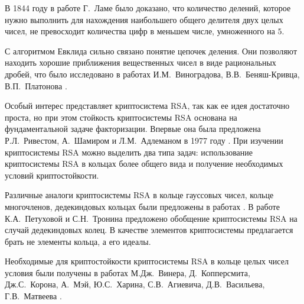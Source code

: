 \documentclass[_00_dissertation.tex]{subfiles}
\begin{document}
В 1844 году в работе Г.~Ламе было доказано, что количество делений, которое нужно выполнить для нахождения наибольшего общего делителя двух целых чисел, не превосходит количества цифр в меньшем числе, умноженного на $5$.

С алгоритмом Евклида сильно связано понятие цепочек деления.
Они позволяют находить хорошие приближения вещественных чисел в виде рациональных дробей, что было исследовано в работах И.М.~Виноградова,  В.В.~Беняш-Кривца, В.П.~Платонова \cite{source:Benyash-Krivets_1, source:Benyash-Krivets_2, source:Vinogradov}.

Особый интерес представляет криптосистема RSA, так как ее идея достаточно проста, но при этом стойкость криптосистемы RSA основана на фундаментальной задаче факторизации.
Впервые она была предложена Р.Л.~Ривестом, А.~Шамиром и Л.М.~Адлеманом в 1977 году \cite{source:Rivest}.
При изучении криптосистемы RSA можно выделить два типа задач: использование криптосистемы RSA в кольцах более общего вида и получение необходимых условий криптостойкости.

Различные аналоги криптосистемы RSA в кольце гауссовых чисел, кольце многочленов, дедекиндовых кольцах были предложены в работах \cite{source:El_Kassar, source:Elkamchouchi, source:Koval, source:Li}.
В работе К.А.~Петуховой и С.Н.~Тронина \cite{source:Petukhova} предложено обобщение криптосистемы RSA на случай дедекиндовых колец.
В качестве элементов криптосистемы предлагается брать не элементы кольца, а его идеалы.

Необходимые для криптостойкости криптосистемы RSA в кольце целых чисел условия были получены в работах М.Дж.~Винера, Д.~Копперсмита, Дж.С.~Корона, А.~Мэй, Ю.С.~Харина, С.В.~Агиевича, Д.В.~Васильева, Г.В.~Матвеева \cite{source:Matveev_2019, source:Matveev_2018, source:Kharin, source:Coppersmith, source:Coron, source:Wiener}.

\onlyinsubfile{
    
}
\end{document}
